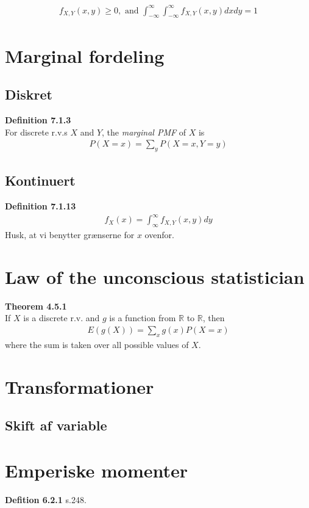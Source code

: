 \documentclass{article}
\begin{document}
\begin{align*}
  f_{X,Y}(x,y) \geq 0, \text{ and } \int_{-\infty}^{\infty}{\int_{-\infty}^{\infty}{f_{X,Y}(x,y)}dx}dy = 1
\end{align*}
\section*{Marginal fordeling}
\subsection*{Diskret}
\textbf{Definition 7.1.3}\\
For discrete r.v.s $X$ and $Y$, the \textit{marginal PMF} of $X$ is
\begin{align*}
  P(X = x) = \sum_y P(X = x, Y = y)
\end{align*}

\subsection*{Kontinuert}
\textbf{Definition 7.1.13}\\
\begin{align*}
  f_{X}(x) = \int_{\infty}^{\infty}{f_{X,Y}(x,y)}dy
\end{align*}
Husk, at vi benytter grænserne for $x$ ovenfor.
\section*{Law of the unconscious statistician}
\textbf{Theorem 4.5.1}\\
If $X$ is a discrete r.v. and $g$ is a function from $\mathbb{R}$ to $\mathbb{R}$, then
\begin{align*}
  E(g(X)) = \sum_{x}{g(x) P(X = x)}
\end{align*}
where the sum is taken over all possible values of $X$.

\section*{Transformationer}
\subsection*{Skift af variable}



\section*{Emperiske momenter}
\textbf{Defition 6.2.1} s.248.\\
\end{document}
